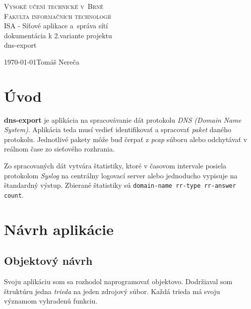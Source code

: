 \documentclass{article}
\begin{document}
    \begin{titlepage}
        \begin{center}
            \textsc{\Huge Vysoké učení technické v~Brně\\
            		\huge Fakulta informačních technologií\\}
            {\LARGE ISA - Síťové aplikace a~správa sítí\\}\vspace{2em}
            {\Large dokumentácia k 2.variante projektu\\}\vspace{2em}
            \Huge dns-export\\
        \end{center}
        {\Large \today \hfill Tomáš Nereča}\vspace{-2em}
    \end{titlepage}

    \tableofcontents
        \thispagestyle{empty}
        \newpage
        \setcounter{page}{1}
    \newpage
    
    \section{Úvod}

        \textbf{dns-export} je aplikácia na spracovávanie dát protokolu \emph{DNS (Domain Name System)}.
        Aplikácia teda musí vedieť identifikovať a spracovať \emph{paket} daného protokolu.
        Jednotlivé pakety môže buď čerpať z \emph{pcap} súboru alebo odchytávať v reálnom čase
        zo sieťového rozhrania.

        Zo spracovaných dát vytvára štatistiky, ktoré v časovom intervale posiela protokolom \emph{Syslog}
        na centrálny logovací server alebo jednoducho vypisuje na štandardný výstup. Zbierané štatistiky sú
        \texttt{domain-name rr-type rr-answer count}.
    
    \section{Návrh aplikácie}

        \subsection{Objektový návrh}
        Svoju aplikáciu som sa rozhodol naprogramovať objektovo. Dodržiaval som štruktúru jedna \emph{trieda}
        na jeden zdrojový súbor. Každá trieda má svoju významom vyhradenú funkciu. 
\end{document}
